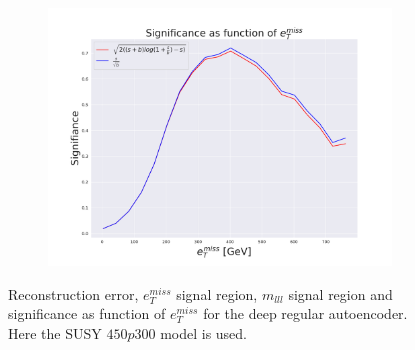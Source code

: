 \begin{figure}[H]
    \hfill 
    \begin{subfigure}{.40\textwidth}
        \includegraphics[width=\textwidth]{Figures/VAE_testing/big/2lep/significance_etmiss_450p0p0300_-0.40609370505539655.pdf}
        \caption{}
        \label{fig:VAE_2lep_big_signi_450_3}
    \end{subfigure}
    \hfill      
    \caption[2lep deep network | $450p300$ | VAE | 3]{Reconstruction error, $e_T^{miss}$ signal region, $m_{lll}$ signal region and significance as function of 
    $e_T^{miss}$ for the deep regular autoencoder. Here the SUSY $450p300$ model is used.}
    \label{fig:VAE_2lep_big_rec_sig_signi_450_3}
\end{figure}


